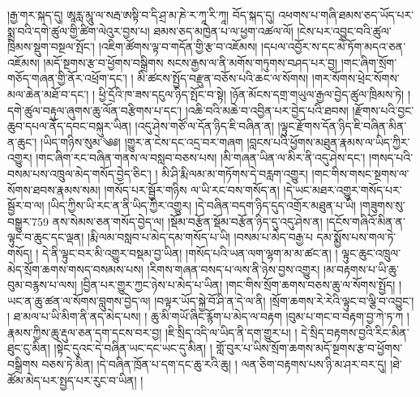 །རྒྱ་གར་སྐད་དུ། ཨཱརླ་མཱུ་ལ་སརྦ་ཨསྟི་བ་དི་ཤྲ་མ་ཎེ་ར་ཀཱ་རི་ཀཱ། བོད་སྐད་དུ། འཕགས་པ་གཞི་ཐམས་ཅད་ཡོད་པར་སྨྲ་བའི་དགེ་ཚུལ་གྱི་ཚིག་ལེའུར་བྱས་པ། ཐམས་ཅད་མཁྱེན་པ་ལ་ཕྱག་འཚལ་ལོ། །ངེས་པར་འབྱུང་བའི་ཚུལ་ཁྲིམས་སྡུག་བསྔལ་སྤོང་། །འཇིག་ཚོགས་ལྟ་བ་གདོན་གྱི་རྩ་བ་འཇོམས། །དཔལ་འབྱོར་ས་དང་མེ་ཏོག་མདའ་ཅན་འཇོམས། །མདོ་སྔགས་རྩ་བ་ཕྱོགས་བསྒྲིགས སངས་རྒྱས་ལ་ནི་མགོས་གཏུགས་བཤད་པར་བྱ། །གང་ཞིག་སྲོག་གཅོད་གཞན་གྱི་ནོར་འཕྲོག་དང་། ། མི་ཚངས་སྤྱོད་བརྫུན་བཅོས་པའི་ཆང་ལ་སོགས། །གར་སོགས་ཕྲེང་སོགས་མལ་ཆེན་མཐོ་བ་དང་། ། ཕྱི་དྲོའི་ཁ་ཟས་དངུལ་ཉིད་སྤོང་བ་སྟེ། །ཉོན་མོངས་དགྲ་གཡུལ་རྒྱལ་བྱེད་ཚུལ་ཁྲིམས་ཏེ། །དགེ་ཚུལ་བརྟུལ་ཞུགས་ཆུ་ལོན་བརྩིགས་པ་དང་། །འཆི་བའི་མཆེ་བ་འབྱིན་པར་བྱེད་པའི་ཐབས། །རྫོགས་པའི་བྱང་ཆུབ་དཔལ་ནོད་དབང་བསྐུར་ཡིན། །འདུ་ཤེས་གཙོ་ལ་དོན་ཉིད་ཇི་བཞིན་ན། །ལྟུང་རྫོགས་དོན་ཉིད་ཇི་བཞིན་མིན་ན་ཆུང་། །ཡིད་གཉིས་སུམ་༄༅། །གྱུར་ན་ངེས་དང་འདྲ་བར་གཞག །བླངས་པའི་ཕྱོགས་མཐུན་རྣམས་ལ་ཡིད་ཀྱིར་འགྱུར། །གང་ཞིག་རང་བཞིན་གནས་ལ་བསླབ་བཅས་པས། །མི་གཞན་ཡིན་ལ་མིར་ནི་འདུ་ཤེས་དང་། །གསད་པའི་བསམ་པས་འཁྲུལ་མེད་གསོད་བྱེད་ཅིང་། ། མི་ཤི་རྨི་ལམ་མ་གཏོགས་དེ་བརླག་འགྱུར། །གང་གིས་གསང་སྔགས་ལ་སོགས་ཐབས་རྣམས་སམ། །གསོད་པར་སྦྱོར་གཉིས ལ་ཡི་རང་བས་གསོད་ན། །དེ་ཡང་མཐར་འགྱུར་གསོད་པར་སྦྱོར་བ་ལ། །ཡིད་ཀྱིས་ཡི་རང་ན་ནི་ཡིད་ཀྱིར་འགྱུར། །དེ་བཞིན་བདག་ཉིད་དུད་འགྲོར་མཐུན་པ་ཡི། །གཟུགས་སུ་བསྒྱུར་759 ནས་སེམས་ཅན་གསོད་བྱེད་ལ། །སྡོམ་བརྩོན་སྡོམ་བརྩོན་ཉིད་དུ་འདུ་ཤེས་ན། །དངོས་གཞིའོ་མིན་ན་ལྟུང་བ་ཆུང་དང་ལྡན། །རྨི་ལམ་བསླབ་པ་མེད་དམ་གསོད་པ་ཡི། །བསམ་པ་མེད་བརྒྱ་པ དམ་སྨྱོས་པས་གལ་ཏེ་གསོད། ། དེ་ནི་ལྟུང་བར་མི་འགྱུར་བསྡམ་བྱ་ཡིན། །གསོད་པའི་ཡན་ལག་ལྷག་མ་མ་ཚང་ན། ། ལྟུང་ཆུང་འཁྲུལ་མེད་སྲོག་ཆགས་གསད་བསམས་པས། །རིགས་གཞན་བསད་པ་ལས་ནི་ཉེས་བྱས་འགྱུར། །མ་བརྟགས་པ་ཡི་ཆུ་བུམ་བརྙས་པ་ལས། །བྱིན་པར་གྱུར་ཀྱང་ཉེས་པ་མེད་པ་ཡིན། །གང་གིས་སྲོག་ཆགས་བཅས་ཆུ་ལ་སོགས་སྤྱོད། །ཡང་ན་ཆུ་ཚན་ལ་སོགས་བླུགས་བྱེད་ལ། །བལྟར་ཡོད་སྐྱེ་བོ་ཤི་ན་དེ་ལ་ནི། །སྲོག་ཆགས་རེ་རེའི་ལྟུང་བ་ལྕི་བ་འབྱུང་། ། ཐ་མལ་པ་ཡི་མིག་ནི་ནད་མེད་པས། ། ཆུ་མི་གཡོ་ཞིང་རྙོག་པ་མེད་ལ་བརྟག །བུམ་པ་གང་བ་བརྟག་བྱ་ཀེ་ཏ་ཀ །རྣམས་ཀྱིས་ཆུ་རྡུལ་ཅན་དག་དངས་བར་བྱ། །ཇི་སྲིད་འདི་ལ་ཡིད་ནི་དག་གྱུར་པ། ། དེ་སྲིད་བརྟགས་བྱའི་རིང་མིན་ཐུང་ངུ་མིན། །སྟེང་དུའང་དེ་བཞིན་ཡང་དང་ཡང་དུ་མིན། ། གློ་བུར་པ་ཡིས་སྲོག་ཆགས་མདོ་སྔགས་རྩ་བ་ཕྱོགས་བསྒྲིགས བཅས་ཏེ་མིན། །དེ་བཞིན་ཁྲོན་པ་དག་དང་ཆུ་རའི་ཆུ། ། ལན་ཅིག་བརྟགས་པས་ཉི་མ་ཤར་བར་དུ། །ཐེ་ཚོམ་མེད་པར་སྤྱད་པར་རུང་བ་ཡིན། །
